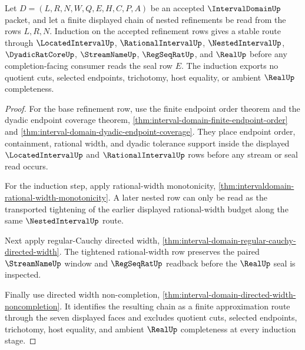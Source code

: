 \begin{theorem}
\label{thm:interval-domain-directed-approximation-induction}
Let $D=(L,R,N,W,Q,E,H,C,P,A)$ be an accepted $\IntervalDomainUp$ packet, and let a finite displayed chain of nested refinements be read from the rows $L,R,N$. Induction on the accepted refinement rows gives a stable route through $\LocatedIntervalUp$, $\RationalIntervalUp$, $\NestedIntervalUp$, $\DyadicRatCoreUp$, $\StreamNameUp$, $\RegSeqRatUp$, and $\RealUp$ before any completion-facing consumer reads the seal row $E$. The induction exports no quotient cuts, selected endpoints, trichotomy, host equality, or ambient $\RealUp$ completeness.
\end{theorem}
\begin{proof}
For the base refinement row, use the finite endpoint order theorem and the dyadic endpoint coverage theorem, \autoref{thm:interval-domain-finite-endpoint-order} and \autoref{thm:interval-domain-dyadic-endpoint-coverage}. They place endpoint order, containment, rational width, and dyadic tolerance support inside the displayed $\LocatedIntervalUp$ and $\RationalIntervalUp$ rows before any stream or seal read occurs.

For the induction step, apply rational-width monotonicity, \autoref{thm:intervaldomain-rational-width-monotonicity}. A later nested row can only be read as the transported tightening of the earlier displayed rational-width budget along the same $\NestedIntervalUp$ route.

Next apply regular-Cauchy directed width, \autoref{thm:interval-domain-regular-cauchy-directed-width}. The tightened rational-width row preserves the paired $\StreamNameUp$ window and $\RegSeqRatUp$ readback before the $\RealUp$ seal is inspected.

Finally use directed width non-completion, \autoref{thm:interval-domain-directed-width-noncompletion}. It identifies the resulting chain as a finite approximation route through the seven displayed faces and excludes quotient cuts, selected endpoints, trichotomy, host equality, and ambient $\RealUp$ completeness at every induction stage.
\end{proof}

